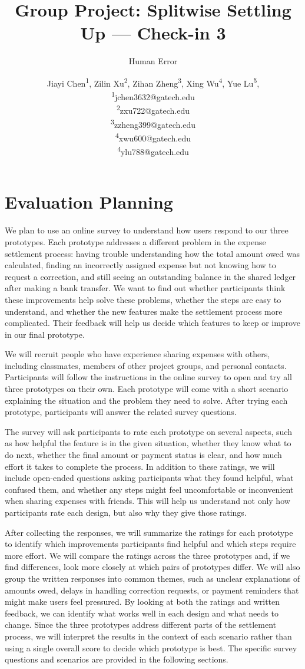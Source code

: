 \documentclass[letterpaper]{jdf}
\author{Human Error}
\title{Group Project: Splitwise Settling Up --- Check-in 3}
\author{
Jiayi Chen\textsuperscript{1},
Zilin Xu\textsuperscript{2},
Zihan Zheng\textsuperscript{3},
Xing Wu\textsuperscript{4},
Yue Lu\textsuperscript{5},
\\
\small
\textsuperscript{1}jchen3632@gatech.edu\\
\textsuperscript{2}zxu722@gatech.edu\\
\textsuperscript{3}zzheng399@gatech.edu\\
\textsuperscript{4}xwu600@gatech.edu\\
\textsuperscript{4}ylu788@gatech.edu
}
\begin{document}
\maketitle




\section{Evaluation Planning}

We plan to use an online survey to understand how users respond to our three prototypes. Each prototype addresses a different problem in the expense settlement process: having trouble understanding how the total amount owed was calculated, finding an incorrectly assigned expense but not knowing how to request a correction, and still seeing an outstanding balance in the shared ledger after making a bank transfer. We want to find out whether participants think these improvements help solve these problems, whether the steps are easy to understand, and whether the new features make the settlement process more complicated. Their feedback will help us decide which features to keep or improve in our final prototype.

We will recruit people who have experience sharing expenses with others, including classmates, members of other project groups, and personal contacts. Participants will follow the instructions in the online survey to open and try all three prototypes on their own. Each prototype will come with a short scenario explaining the situation and the problem they need to solve. After trying each prototype, participants will answer the related survey questions.

The survey will ask participants to rate each prototype on several aspects, such as how helpful the feature is in the given situation, whether they know what to do next, whether the final amount or payment status is clear, and how much effort it takes to complete the process. In addition to these ratings, we will include open-ended questions asking participants what they found helpful, what confused them, and whether any steps might feel uncomfortable or inconvenient when sharing expenses with friends. This will help us understand not only how participants rate each design, but also why they give those ratings.

After collecting the responses, we will summarize the ratings for each prototype to identify which improvements participants find helpful and which steps require more effort. We will compare the ratings across the three prototypes and, if we find differences, look more closely at which pairs of prototypes differ. We will also group the written responses into common themes, such as unclear explanations of amounts owed, delays in handling correction requests, or payment reminders that might make users feel pressured. By looking at both the ratings and written feedback, we can identify what works well in each design and what needs to change. Since the three prototypes address different parts of the settlement process, we will interpret the results in the context of each scenario rather than using a single overall score to decide which prototype is best. The specific survey questions and scenarios are provided in the following sections.
\end{document}
